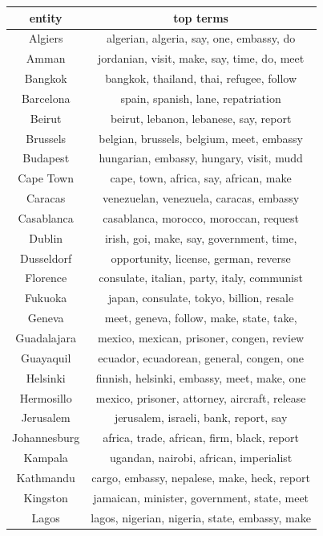 \begin{table}
\centering
\small
\begin{tabular}{cc}
\toprule
entity & top terms \\
\midrule
Algiers & algerian, algeria, say, one, embassy, do \\
Amman & jordanian, visit, make, say, time, do, meet \\
Bangkok & bangkok, thailand, thai, refugee, follow \\
Barcelona & spain, spanish, lane, repatriation \\ 
Beirut & beirut, lebanon, lebanese, say, report \\
Brussels & belgian, brussels, belgium, meet, embassy \\
Budapest & hungarian, embassy, hungary, visit, mudd \\
Cape Town & cape, town, africa, say, african, make \\
Caracas & venezuelan, venezuela, caracas, embassy \\ 
Casablanca & casablanca, morocco, moroccan, request \\
Dublin & irish, goi, make, say, government, time, \\
Dusseldorf & opportunity, license, german, reverse \\ 
Florence & consulate, italian, party, italy, communist \\
Fukuoka & japan, consulate, tokyo, billion, resale \\
Geneva & meet, geneva, follow, make, state, take, \\
Guadalajara & mexico, mexican, prisoner, congen, review \\
Guayaquil & ecuador, ecuadorean, general, congen, one \\
Helsinki & finnish, helsinki, embassy, meet, make, one \\
Hermosillo & mexico, prisoner, attorney, aircraft, release \\
Jerusalem & jerusalem, israeli, bank, report, say \\
Johannesburg & africa, trade, african, firm, black, report \\
Kampala & ugandan, nairobi, african, imperialist \\
Kathmandu & cargo, embassy, nepalese, make, heck, report \\
Kingston & jamaican, minister, government, state, meet \\
Lagos & lagos, nigerian, nigeria, state, embassy, make \\

\end{tabular}
\end{table}

